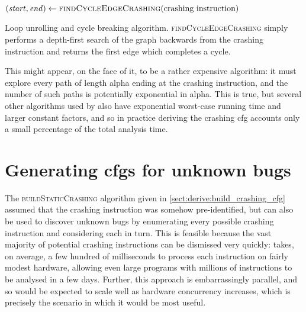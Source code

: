 \begin{sanefig}
\begin{algorithmic}
     \State $(\mathit{start}, \mathit{end}) \gets \textsc{findCycleEdgeCrashing}(\text{crashing instruction})$
        \EndFor
     \EndIf
  \EndWhile
  \EndFunction
\end{algorithmic}
\caption{Loop unrolling and cycle breaking algorithm.
  \textsc{findCycleEdgeCrashing} simply performs a depth-first search
  of the graph backwards from the crashing instruction and returns the
  first edge which completes a cycle.}
\label{fig:derive:read:unroll_cycle_break}
\end{sanefig}

This might appear, on the face of it, to be a rather expensive
algorithm: it must explore every path of length \gls{alpha} ending at
the crashing instruction, and the number of such paths is potentially
exponential in \gls{alpha}.  This is true, but several other
algorithms used by {\implementation} also have exponential worst-case
running time and larger constant factors, and so in practice deriving
the crashing \gls{cfg} accounts only a small percentage of the total
analysis time.


\section{Generating \protect\glspl{cfg} for unknown bugs}
\label{sect:derive:unknown_bugs}

The \textsc{buildStaticCrashing} algorithm given in
\autoref{sect:derive:build_crashing_cfg} assumed that the
\gls{crashing instruction} was somehow pre-identified, but
    {\technique} can also be used to discover unknown bugs by
    enumerating every possible \gls{crashing instruction} and
    considering each in turn.  This is feasible because the vast
    majority of potential \glspl{crashing instruction} can be
    dismissed very quickly: {\implementation} takes, on average, a few
    hundred of milliseconds to process each instruction on fairly
    modest hardware, allowing even large programs with millions of
    instructions to be analysed in a few days.  Further, this approach
    is embarrassingly parallel, and so would be expected to scale well
    as hardware concurrency increases, which is precisely the scenario
    in which it would be most useful.

